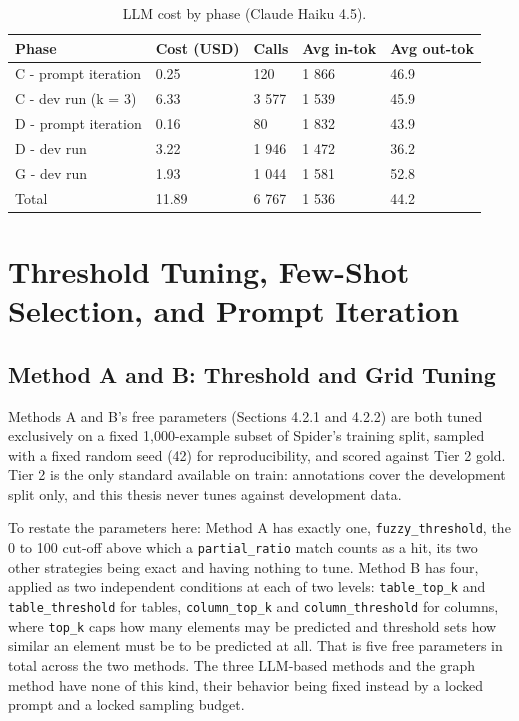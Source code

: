 \begin{table}[htbp]
\centering
\caption{LLM cost by phase (Claude Haiku 4.5).}\label{tab:4-2}
\small\setlength{\tabcolsep}{4pt}
\begin{tabular}{@{}lllll@{}}
\toprule
\textbf{Phase} & \textbf{Cost (USD)} & \textbf{Calls} & \textbf{Avg in-tok} & \textbf{Avg out-tok}\tabularnewline
\midrule
C - prompt iteration & 0.25 & 120 & 1 866 & 46.9\tabularnewline
C - dev run (k = 3) & 6.33 & 3 577 & 1 539 & 45.9\tabularnewline
D - prompt iteration & 0.16 & 80 & 1 832 & 43.9\tabularnewline
D - dev run & 3.22 & 1 946 & 1 472 & 36.2\tabularnewline
G - dev run & 1.93 & 1 044 & 1 581 & 52.8\tabularnewline
Total & 11.89 & 6 767 & 1 536 & 44.2\tabularnewline
\bottomrule
\end{tabular}
\end{table}




\section{Threshold Tuning, Few-Shot Selection, and Prompt Iteration}\label{sec:4-4}

\subsection{Method A and B: Threshold and Grid Tuning}\label{sec:4-4-1}

Methods A and B's free parameters (Sections 4.2.1 and 4.2.2) are both tuned exclusively on a fixed 1,000-example subset of Spider's training split, sampled with a fixed random seed (42) for reproducibility, and scored against Tier 2 gold. Tier 2 is the only standard available on train: \citet{taniguchi2021} annotations cover the development split only, and this thesis never tunes against development data.

To restate the parameters here: Method A has exactly one, \texttt{fuzzy\_threshold}, the 0 to 100 cut-off above which a \texttt{partial\_ratio} match counts as a hit, its two other strategies being exact and having nothing to tune. Method B has four, applied as two independent conditions at each of two levels: \texttt{table\_top\_k} and \texttt{table\_threshold} for tables, \texttt{column\_top\_k} and \texttt{column\_threshold} for columns, where \texttt{top\_k} caps how many elements may be predicted and threshold sets how similar an element must be to be predicted at all. That is five free parameters in total across the two methods. The three LLM-based methods and the graph method have none of this kind, their behavior being fixed instead by a locked prompt and a locked sampling budget.

